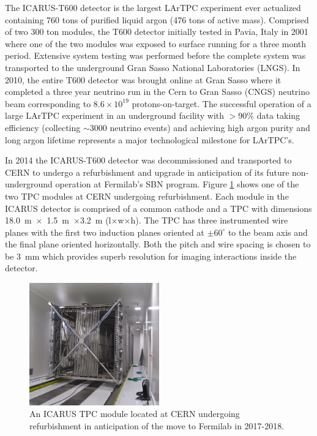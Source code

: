 \label{sec:IF_ICARUS}
The ICARUS-T600 detector is the largest LArTPC experiment ever actualized containing 760 tons of purified liquid argon (476 tons of active mass). Comprised of two 300 ton modules, the T600 detector initially tested in Pavia, Italy in 2001 where one of the two modules was exposed to surface running for a three month period. Extensive system testing was performed before the complete system was transported to the underground Gran Sasso National Laboratories (LNGS). In 2010, the entire T600 detector was brought online at Gran Sasso where it completed a three year neutrino run in the Cern to Gran Sasso (CNGS) neutrino beam corresponding to $8.6 \times 10^{19}$ protons-on-target. The successful operation of a large LArTPC experiment in an underground facility with $>90\%$ data taking efficiency (collecting $\sim$3000 neutrino events) and achieving high argon purity and long argon lifetime represents a major technological milestone for LArTPC's.

In 2014 the ICARUS-T600 detector was decommissioned and transported to CERN to undergo a refurbishment and upgrade in anticipation of its future non-underground operation at Fermilab's SBN program. Figure \ref{fig:ICARUSTPC} shows one of the two TPC modules at CERN undergoing refurbishment. Each module in the ICARUS detector is comprised of a common cathode and a TPC with dimensions 18.0~m~$\times$~1.5~m~$\times$3.2~m (l$\times$w$\times$h). The TPC has three instrumented wire planes with the first two induction planes oriented at $\pm 60^{\circ}$ to the beam axis and the final plane oriented horizontally. Both the pitch and wire spacing is chosen to be 3~mm which provides superb resolution for imaging interactions inside the detector. 

\begin{figure}[htb]
\centering
\includegraphics[width=0.50\textwidth]{images/ICARUSTPC.png}
\caption[]{An ICARUS TPC module located at CERN undergoing refurbishment in anticipation of the move to Fermilab in 2017-2018.}
\label{fig:ICARUSTPC}
\end{figure}

